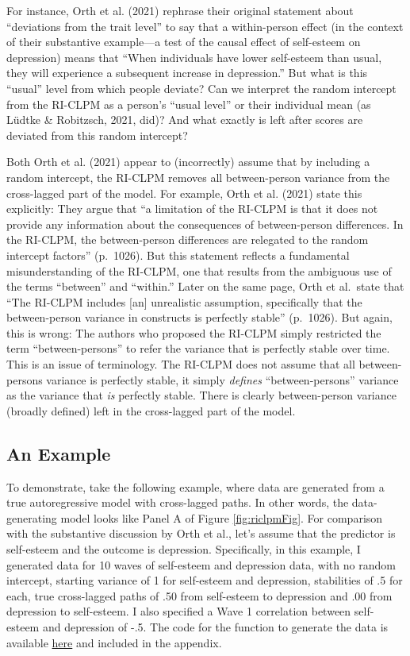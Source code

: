 \documentclass[
  english,
  man,floatsintext]{apa6}
\begin{document}
For instance, Orth et al. (2021) rephrase their original statement about ``deviations from the trait level'' to say that a within-person effect (in the context of their substantive example---a test of the causal effect of self-esteem on depression) means that ``When individuals have lower self-esteem than usual, they will experience a subsequent increase in depression.'' But what is this ``usual'' level from which people deviate? Can we interpret the random intercept from the RI-CLPM as a person's ``usual level'' or their individual mean (as Lüdtke \& Robitzsch, 2021, did)? And what exactly is left after scores are deviated from this random intercept?

Both Orth et al. (2021) appear to (incorrectly) assume that by including a random intercept, the RI-CLPM removes all between-person variance from the cross-lagged part of the model. For example, Orth et al. (2021) state this explicitly: They argue that ``a limitation of the RI-CLPM is that it does not provide any information about the consequences of between-person differences. In the RI-CLPM, the between-person differences are relegated to the random intercept factors'' (p.~1026). But this statement reflects a fundamental misunderstanding of the RI-CLPM, one that results from the ambiguous use of the terms ``between'' and ``within.'' Later on the same page, Orth et al.~state that ``The RI-CLPM includes {[}an{]} unrealistic assumption, specifically that the between-person variance in constructs is perfectly stable'' (p.~1026). But again, this is wrong: The authors who proposed the RI-CLPM simply restricted the term ``between-persons'' to refer the variance that is perfectly stable over time. This is an issue of terminology. The RI-CLPM does not assume that all between-persons variance is perfectly stable, it simply \emph{defines} ``between-persons'' variance as the variance that \emph{is} perfectly stable. There is clearly between-person variance (broadly defined) left in the cross-lagged part of the model.

\hypertarget{an-example}{%
\subsection{An Example}\label{an-example}}

To demonstrate, take the following example, where data are generated from a true autoregressive model with cross-lagged paths. In other words, the data-generating model looks like Panel A of Figure \ref{fig:riclpmFig}. For comparison with the substantive discussion by Orth et al., let's assume that the predictor is self-esteem and the outcome is depression. Specifically, in this example, I generated data for 10 waves of self-esteem and depression data, with no random intercept, starting variance of 1 for self-esteem and depression, stabilities of .5 for each, true cross-lagged paths of .50 from self-esteem to depression and .00 from depression to self-esteem. I also specified a Wave 1 correlation between self-esteem and depression of -.5. The code for the function to generate the data is available \href{https://github.com/rlucas11/starts/blob/main/gen_starts.R}{here} and included in the appendix.
\end{document}
